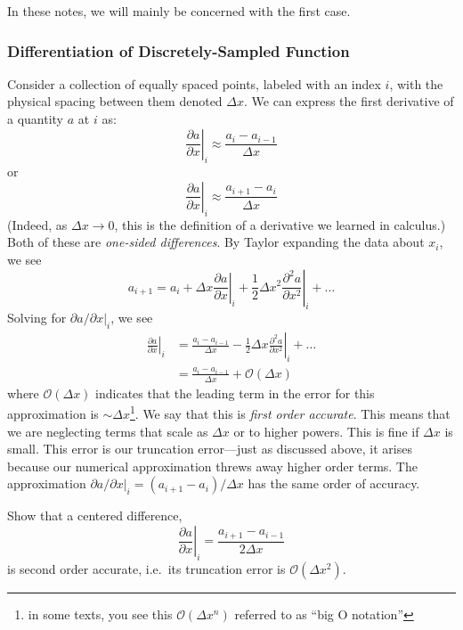  In these notes, we will mainly be concerned with the first case.

\subsubsection{Differentiation of Discretely-Sampled Function}
\label{ch:intro:diff}
Consider a collection of equally spaced points, labeled with an index
$i$, with the physical spacing between them denoted $\Delta
x$.   We can express the first derivative of
a quantity $a$ at $i$ as:
\begin{equation}
\left . \frac{\partial a}{\partial x} \right |_i \approx \frac{a_i - a_{i-1}}{\Delta x}
\end{equation}
or
\begin{equation}
\left . \frac{\partial a}{\partial x} \right |_i \approx \frac{a_{i+1} - a_i}{\Delta x}
\end{equation}
%
(Indeed, as $\Delta x \rightarrow 0$, this is the definition of a
derivative we learned in calculus.)  Both of these are {\em one-sided
  differences}.  By Taylor expanding the data about $x_i$, we see
\begin{equation}
a_{i+1} = a_i + \Delta x \left . \frac{\partial a}{\partial x} \right |_i + \frac{1}{2} \Delta x^2 \left . \frac{\partial^2 a}{\partial x^2} \right |_i + \ldots
\end{equation}
Solving for ${\partial a}/{\partial x} |_i$, we see
\begin{align}
\left . \frac{\partial a}{\partial x} \right |_i &= 
    \frac{a_i - a_{i-1}}{\Delta x} - \frac{1}{2}\Delta x \left . \frac{\partial^2 a}{\partial x^2} \right |_i + \ldots \\ 
%
 &= \frac{a_i - a_{i-1}}{\Delta x} + \mathcal{O}(\Delta x)
\end{align}
where $\mathcal{O}(\Delta x)$ indicates that the leading term in the
error for this approximation is $\sim \Delta x$\footnote{in some
  texts, you see this $\mathcal{O}(\Delta x^n)$ referred to as ``big O
  notation''}.  We say that this is {\em first order accurate}.  This
means that we are neglecting terms that scale as $\Delta x$ or to
higher powers.  This is fine if $\Delta x$ is small.  This error is our
truncation error---just as discussed above, it arises because our
numerical approximation threws away higher order terms.  The
approximation ${\partial a}/{\partial x} |_i = ({a_{i+1} -
  a_i})/{\Delta x}$ has the same order of accuracy.

\begin{exercise}
{Show that a centered difference,
 \begin{equation*}
\left .\frac{\partial a}{\partial x} \right |_i = \frac{a_{i+1} - a_{i-1}}{2 \Delta x}
\end{equation*}
is second order
accurate, i.e.\ its truncation error is $\mathcal{O}(\Delta x^2)$.}
\end{exercise}

